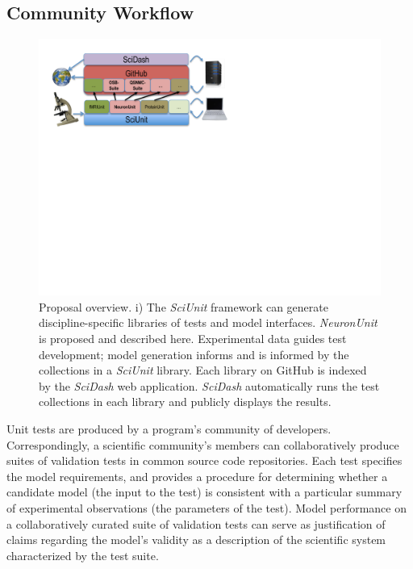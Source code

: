 \documentclass[11pt,letterpaper]{article}
\begin{document}
\subsection{Community Workflow}
\begin{figure}
\vspace{-40px}
\includegraphics[scale=0.65]{sciunit_overview.pdf}
\caption{Proposal overview. \scriptsize{i) The \textit{SciUnit} framework can generate discipline-specific libraries of tests and model interfaces.  \textit{NeuronUnit} is proposed and described here.  Experimental data guides test development; model generation informs and is informed by the collections in a \textit{SciUnit} library.  Each  library on GitHub is indexed by the \textit{SciDash} web application.  \textit{SciDash} automatically runs the test collections in each library and publicly displays the results.}}
\vspace{-10px}
\label{fig:sciunit_overview}
\end{figure}
\leavevmode
Unit tests are produced by a program's community of developers. Correspondingly, a scientific community's members can collaboratively produce suites of validation tests in common source code repositories. Each test specifies the model requirements, and provides a procedure for determining whether a candidate model (the input to the test) is consistent with a particular summary of experimental observations (the parameters of the test). Model performance on a collaboratively curated suite of validation tests can serve as justification of claims regarding the model's validity as a description of the scientific system characterized by the test suite.
\end{document}
